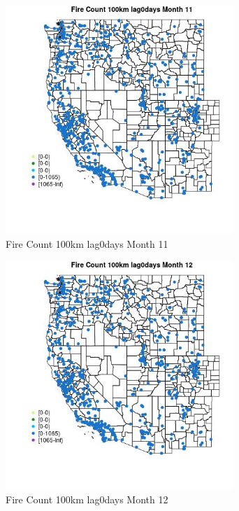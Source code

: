 \begin{figure} 
\centering  
\includegraphics[width=0.77\textwidth]{Code_Outputs/Report_ML_input_PM25_Step4_part_f_de_duplicated_aveswNAs_MapObsMo11Fire_Count_100km_lag0days.jpg} 
\caption{\label{fig:Report_ML_input_PM25_Step4_part_f_de_duplicated_aveswNAsMapObsMo11Fire_Count_100km_lag0days}Fire Count 100km lag0days Month 11} 
\end{figure} 
 

\begin{figure} 
\centering  
\includegraphics[width=0.77\textwidth]{Code_Outputs/Report_ML_input_PM25_Step4_part_f_de_duplicated_aveswNAs_MapObsMo12Fire_Count_100km_lag0days.jpg} 
\caption{\label{fig:Report_ML_input_PM25_Step4_part_f_de_duplicated_aveswNAsMapObsMo12Fire_Count_100km_lag0days}Fire Count 100km lag0days Month 12} 
\end{figure} 
 

